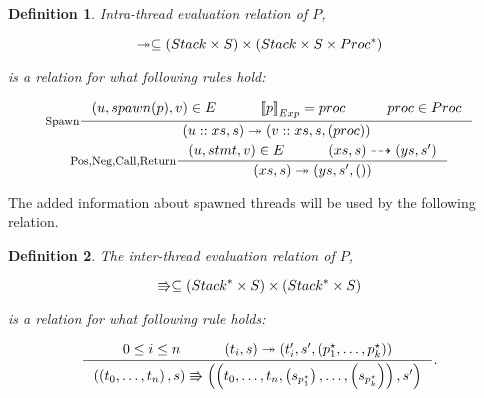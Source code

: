 \documentclass[..thesis.tex]{subfiles}
\newtheorem{defin}{Definition}[section]
\begin{document}
\begin{defin}

  Intra-thread evaluation relation of $P$,

  \begin{equation*}
    \twoheadrightarrow \subseteq  \left( Stack \times S \right) \times \left( Stack \times S \times Proc^\ast \right)
  \end{equation*}

  is a relation for what following rules hold:

  \addtolength{\jot}{2em}
  \begin{gather*}
    \inference[Spawn]{\lp u, spawn(p), v \rp \in E  \separ  \lllb p \rrrb_{Exp} = proc \separ proc \in Proc  }{ \lp u :: xs, s \rp \intrathread \lp v :: xs, s, (proc) \rp} \\
    \inference[Pos,Neg,Call,Return] {\lp u, stmt, v \rp \in E \separ \lp xs , s \rp \interproc \lp ys, s' \rp }{ \lp xs , s \rp \intrathread \lp ys, s', \lp \rp \rp}
  \end{gather*}
  \addtolength{\jot}{-2em}

\end{defin}


The added information about spawned threads will be used by the following relation.

\begin{defin}

  The inter-thread evaluation relation of $P$, 
 
  \begin{equation*}
    \Rrightarrow \subseteq \left( Stack^\ast \times S \right) \times \left( Stack^\ast \times S \right)
  \end{equation*}

  is a relation for what following rule holds:   

  \begin{equation*}
    \inference{ 0 \leq i \leq n  \separ \lp t_i , s \rp \intrathread \lp t'_i, s', \lp p_1^\star, \ldots, p_k^{\star} \rp \rp}{ \lp \lp t_0, \ldots, t_n \rp, s \rp \interthread  \lp \lp t_0, \ldots, t_n, \lp s_{p_1^{\star}} \rp, \ldots, \lp s_{p_k^{\star}} \rp  \rp , s' \rp} \text{.}
  \end{equation*}

\end{defin}
\end{document}
